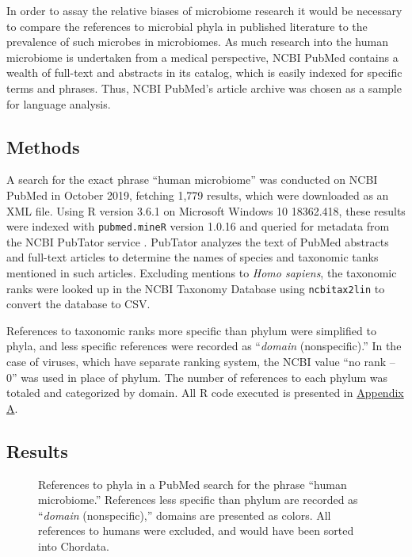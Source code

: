 \documentclass[american]{../../../coursework}
\begin{document}
In order to assay the relative biases of microbiome research it would be
necessary to compare the references to microbial phyla in published
literature to the prevalence of such microbes in microbiomes. As much
research into the human microbiome is undertaken from a medical perspective,
NCBI PubMed contains a wealth of full-text and abstracts in its catalog,
which is easily indexed for specific terms and phrases. Thus, NCBI PubMed's
article archive was chosen as a sample for language analysis.

\subsection{Methods}

A search for the exact phrase ``human microbiome'' was conducted on NCBI
PubMed in October 2019, fetching 1,779 results, which were downloaded as an
XML file. Using R version 3.6.1 \parencite{RCo19} on Microsoft Windows 10
18362.418, these results were indexed with \texttt{pubmed.mineR} version
1.0.16 \parencite{Ran19} and queried for metadata from the NCBI PubTator
service \parencite{Wei19}. PubTator analyzes the text of PubMed abstracts and
full-text articles to determine the names of species and taxonomic tanks
mentioned in such articles. Excluding mentions to \textit{Homo sapiens}, the
taxonomic ranks were looked up in the NCBI Taxonomy Database
\parencite{Nat19} using \texttt{ncbitax2lin} \parencite{Xue19} to convert the
database to CSV.

References to taxonomic ranks more specific than phylum were simplified to
phyla, and less specific references were recorded as ``\textit{domain}
(nonspecific).'' In the case of viruses, which have separate ranking system,
the NCBI value ``no rank – 0'' was used in place of phylum. The number of
references to each phylum was totaled and categorized by domain. All R code
executed is presented in \hyperref[sec:appendix_a]{Appendix A}.

\subsection{Results}

\begin{figure}
    
    \caption{References to phyla in a PubMed search for the phrase
             ``human microbiome.'' References less specific than phylum are
             recorded as ``\textit{domain} (nonspecific),'' domains are
             presented as colors. All references to humans were excluded, and
             would have been sorted into Chordata.}
    \label{fig:1}
\end{figure}
\end{document}
